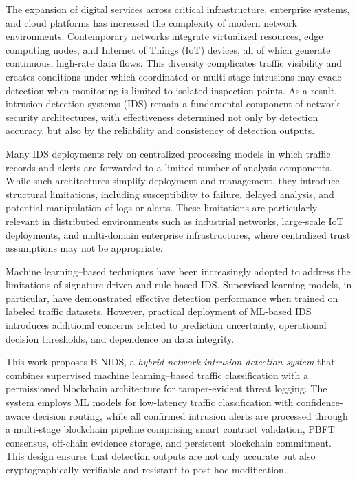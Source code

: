 \documentclass[conference]{IEEEtran}
\begin{document}
The expansion of digital services across critical infrastructure, enterprise systems, and cloud platforms has increased the complexity of modern network environments. Contemporary networks integrate virtualized resources, edge computing nodes, and Internet of Things (IoT) devices, all of which generate continuous, high-rate data flows. This diversity complicates traffic visibility and creates conditions under which coordinated or multi-stage intrusions may evade detection when monitoring is limited to isolated inspection points. As a result, intrusion detection systems (IDS) remain a fundamental component of network security architectures, with effectiveness determined not only by detection accuracy, but also by the reliability and consistency of detection outputs.

Many IDS deployments rely on centralized processing models in which traffic records and alerts are forwarded to a limited number of analysis components. While such architectures simplify deployment and management, they introduce structural limitations, including susceptibility to failure, delayed analysis, and potential manipulation of logs or alerts. These limitations are particularly relevant in distributed environments such as industrial networks, large-scale IoT deployments, and multi-domain enterprise infrastructures, where centralized trust assumptions may not be appropriate.

Machine learning--based techniques have been increasingly adopted to address the limitations of signature-driven and rule-based IDS. Supervised learning models, in particular, have demonstrated effective detection performance when trained on labeled traffic datasets. However, practical deployment of ML-based IDS introduces additional concerns related to prediction uncertainty, operational decision thresholds, and dependence on data integrity.

This work proposes B-NIDS, a \emph{hybrid network intrusion detection system} that combines supervised machine learning--based traffic classification with a permissioned blockchain architecture for tamper-evident threat logging. The system employs ML models for low-latency traffic classification with confidence-aware decision routing, while all confirmed intrusion alerts are processed through a multi-stage blockchain pipeline comprising smart contract validation, PBFT consensus, off-chain evidence storage, and persistent blockchain commitment. This design ensures that detection outputs are not only accurate but also cryptographically verifiable and resistant to post-hoc modification.
\end{document}
